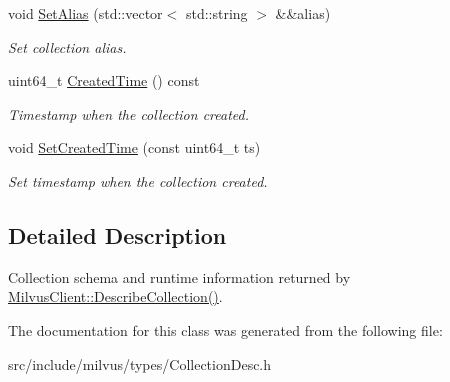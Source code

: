 \begin{DoxyCompactItemize}
\mbox{\label{classmilvus_1_1_collection_desc_a816cb28d871b36bdaeb872d918ba9619}} 
void \hyperlink{classmilvus_1_1_collection_desc_a816cb28d871b36bdaeb872d918ba9619}{Set\+Alias} (std\+::vector$<$ std\+::string $>$ \&\&alias)
\begin{DoxyCompactList}\small\item\em Set collection alias. \end{DoxyCompactList}\item 
\mbox{\label{classmilvus_1_1_collection_desc_a212d74fa96a9006d8580a7a943501b4a}} 
uint64\+\_\+t \hyperlink{classmilvus_1_1_collection_desc_a212d74fa96a9006d8580a7a943501b4a}{Created\+Time} () const
\begin{DoxyCompactList}\small\item\em Timestamp when the collection created. \end{DoxyCompactList}\item 
\mbox{\label{classmilvus_1_1_collection_desc_a34c1c5ad3548ea909a4175529dd7723c}} 
void \hyperlink{classmilvus_1_1_collection_desc_a34c1c5ad3548ea909a4175529dd7723c}{Set\+Created\+Time} (const uint64\+\_\+t ts)
\begin{DoxyCompactList}\small\item\em Set timestamp when the collection created. \end{DoxyCompactList}\end{DoxyCompactItemize}


\subsection{Detailed Description}
Collection schema and runtime information returned by \hyperlink{classmilvus_1_1_milvus_client_a5bdc7d4afdf9c84b7b50b4a8b4508c6e}{Milvus\+Client\+::\+Describe\+Collection()}. 

The documentation for this class was generated from the following file\+:\begin{DoxyCompactItemize}
\item 
src/include/milvus/types/Collection\+Desc.\+h\end{DoxyCompactItemize}
